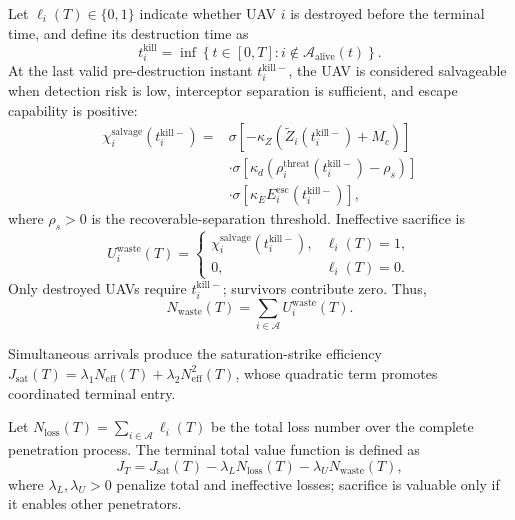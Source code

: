 \documentclass[unbranded]{cja}
\begin{document}
Let $\ell_i(T)\in\{0,1\}$ indicate whether UAV $i$ is destroyed before the terminal time, and define its destruction time as
\begin{equation}
t_i^{\mathrm{kill}}
=
\inf\left\{
t\in[0,T]:
i\notin\mathcal A_{\mathrm{alive}}(t)
\right\}.
\end{equation}
At the last valid pre-destruction instant $t_i^{\mathrm{kill}-}$, the UAV is considered salvageable when detection risk is low, interceptor separation is sufficient, and escape capability is positive:
\begin{equation}
\begin{aligned}
\chi_i^{\mathrm{salvage}}\!\left(t_i^{\mathrm{kill}-}\right)
={}&
\sigma\!\left[-\kappa_Z\left(\widetilde Z_i\!\left(t_i^{\mathrm{kill}-}\right)+M_c\right)\right]\\
&\cdot
\sigma\!\left[\kappa_d\left(\rho_i^{\mathrm{threat}}\!\left(t_i^{\mathrm{kill}-}\right)-\rho_s\right)\right]\\
&\cdot
\sigma\!\left[\kappa_E E_i^{\mathrm{esc}}\!\left(t_i^{\mathrm{kill}-}\right)\right],
\end{aligned}
\end{equation}
where $\rho_s>0$ is the recoverable-separation threshold. Ineffective sacrifice is
\begin{equation}
U_i^{\mathrm{waste}}(T)
=
\begin{cases}
\chi_i^{\mathrm{salvage}}\!\left(t_i^{\mathrm{kill}-}\right),
&
\ell_i(T)=1,\\[2mm]
0,
&
\ell_i(T)=0.
\end{cases}
\end{equation}
Only destroyed UAVs require $t_i^{\mathrm{kill}-}$; survivors contribute zero. Thus,
\begin{equation}
N_{\mathrm{waste}}(T)
=
\sum_{i\in\mathcal{A}} U_i^{\mathrm{waste}}(T).
\end{equation}

Simultaneous arrivals produce the saturation-strike efficiency $J_{\mathrm{sat}}(T)=\lambda_1N_{\mathrm{eff}}(T)+\lambda_2N_{\mathrm{eff}}^2(T)$, whose quadratic term promotes coordinated terminal entry.

Let $N_{\mathrm{loss}}(T)=\sum_{i\in\mathcal{A}}\ell_i(T)$ be the total loss number over the complete penetration process. The terminal total value function is defined as
\begin{equation}
J_T
=
J_{\mathrm{sat}}(T)
-
\lambda_L N_{\mathrm{loss}}(T)
-
\lambda_U N_{\mathrm{waste}}(T),
\end{equation}
where $\lambda_L,\lambda_U>0$ penalize total and ineffective losses; sacrifice is valuable only if it enables other penetrators.
\end{document}
